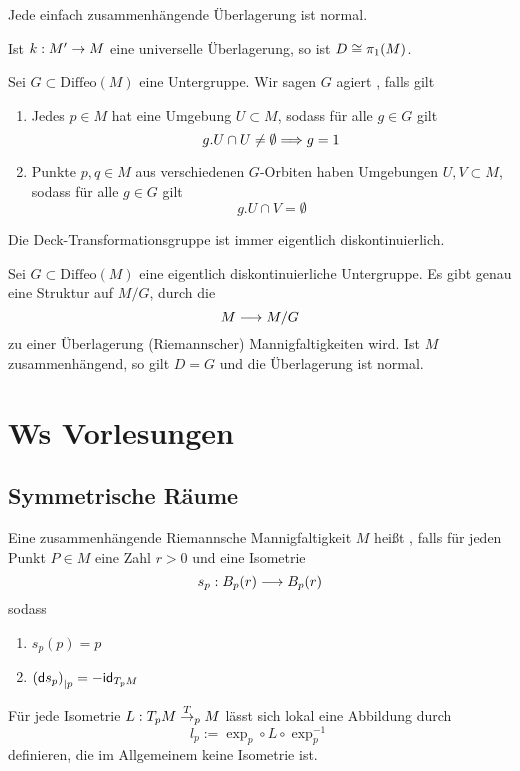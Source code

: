 \documentclass{book}
\renewcommand{\i}{^{-1}}
\renewcommand{\d}{\textsf{d}}
\begin{document}
\Kor{}
Jede einfach zusammenhängende Überlagerung ist normal.

\Satz{}
Ist $k: M' \overset{}{\rightarrow} M$ eine universelle Überlagerung, so ist $D \overset{}{\cong} \pi_1(M)$.

\Def{}
Sei $G \subset \text{Diffeo}(M)$ eine Untergruppe. Wir sagen $G$ agiert , falls gilt
\begin{enumerate}[PD1)]
\item Jedes $p \in M$ hat eine Umgebung $U \subset M$, sodass für alle $g \in G$ gilt
\[ g.U \cap U \neq \emptyset \overset{}{\Longrightarrow} g = 1 \]
\item Punkte $p,q \in M$ aus verschiedenen $G$-Orbiten haben Umgebungen $U,V\subset M$, sodass für alle $g \in G$ gilt
\[ g.U \cap V = \emptyset \]
\end{enumerate}

\Bem{}
Die Deck-Transformationsgruppe ist immer eigentlich diskontinuierlich.

\Lem{}
Sei $G \subset \text{Diffeo}(M)$ eine eigentlich diskontinuierliche Untergruppe. Es gibt genau eine Struktur auf $M/G$, durch die
\[ M \overset{}{\longrightarrow} M/G\]
zu einer Überlagerung (Riemannscher) Mannigfaltigkeiten wird. Ist $M$ zusammenhängend, so gilt $D = G$ und die Überlagerung ist normal.

\newpage
\chapter{Ws Vorlesungen}
\section{Symmetrische Räume}
Eine zusammenhängende Riemannsche Mannigfaltigkeit $M$ heißt , falls für jeden Punkt $P \in M$ eine Zahl $r > 0$ und eine Isometrie
\[ s_p : B_p(r) \overset{}{\longrightarrow} B_p(r) \]
sodass
\begin{enumerate}[1.)]
\item $s_p(p) = p$
\item $\klam{\d s_p}_{|p} = - \id{T_pM}$
\end{enumerate}

\Bem{}
Für jede Isometrie $L : T_pM \overset{T}{\rightarrow}_pM$ lässt sich lokal eine Abbildung durch
\[ l_p := \exp_p \circ L \circ \exp_{p}\i \]
definieren, die im Allgemeinem keine Isometrie ist.
\end{document}
